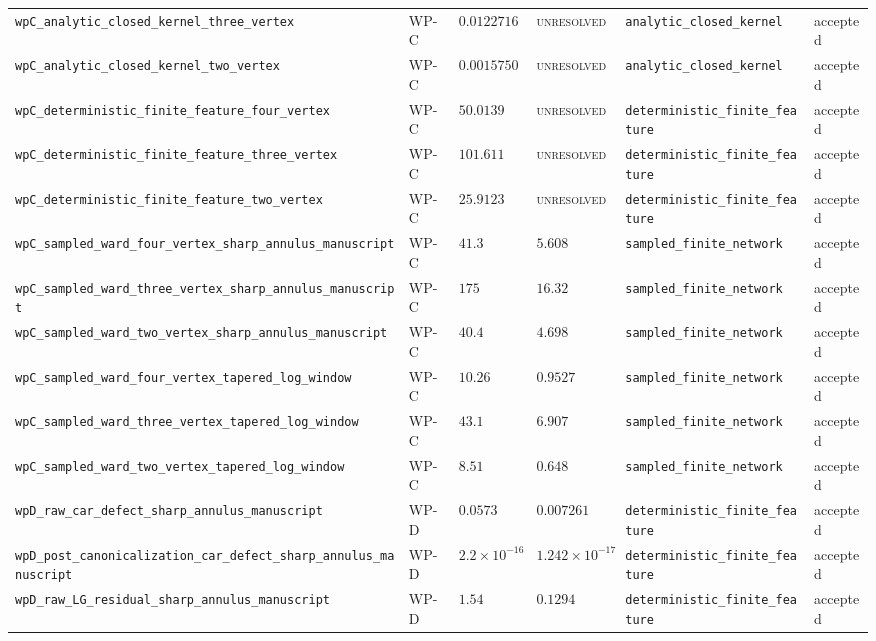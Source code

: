\begin{table}[t]
\begin{tabular}{@{}llllll@{}}
\texttt{wpC\_analytic\_closed\_kernel\_three\_vertex} & WP-C & $0.0122716$ & \textsc{unresolved} & \texttt{analytic\_closed\_kernel} & accepted \\
\texttt{wpC\_analytic\_closed\_kernel\_two\_vertex} & WP-C & $0.00157508$ & \textsc{unresolved} & \texttt{analytic\_closed\_kernel} & accepted \\
\texttt{wpC\_deterministic\_finite\_feature\_four\_vertex} & WP-C & $50.0139$ & \textsc{unresolved} & \texttt{deterministic\_finite\_feature} & accepted \\
\texttt{wpC\_deterministic\_finite\_feature\_three\_vertex} & WP-C & $101.611$ & \textsc{unresolved} & \texttt{deterministic\_finite\_feature} & accepted \\
\texttt{wpC\_deterministic\_finite\_feature\_two\_vertex} & WP-C & $25.9123$ & \textsc{unresolved} & \texttt{deterministic\_finite\_feature} & accepted \\
\texttt{wpC\_sampled\_ward\_four\_vertex\_sharp\_annulus\_manuscript} & WP-C & $41.3$ & $5.608$ & \texttt{sampled\_finite\_network} & accepted \\
\texttt{wpC\_sampled\_ward\_three\_vertex\_sharp\_annulus\_manuscript} & WP-C & $175$ & $16.32$ & \texttt{sampled\_finite\_network} & accepted \\
\texttt{wpC\_sampled\_ward\_two\_vertex\_sharp\_annulus\_manuscript} & WP-C & $40.4$ & $4.698$ & \texttt{sampled\_finite\_network} & accepted \\
\texttt{wpC\_sampled\_ward\_four\_vertex\_tapered\_log\_window} & WP-C & $10.26$ & $0.9527$ & \texttt{sampled\_finite\_network} & accepted \\
\texttt{wpC\_sampled\_ward\_three\_vertex\_tapered\_log\_window} & WP-C & $43.1$ & $6.907$ & \texttt{sampled\_finite\_network} & accepted \\
\texttt{wpC\_sampled\_ward\_two\_vertex\_tapered\_log\_window} & WP-C & $8.51$ & $0.648$ & \texttt{sampled\_finite\_network} & accepted \\
\texttt{wpD\_raw\_car\_defect\_sharp\_annulus\_manuscript} & WP-D & $0.0573$ & $0.007261$ & \texttt{deterministic\_finite\_feature} & accepted \\
\texttt{wpD\_post\_canonicalization\_car\_defect\_sharp\_annulus\_manuscript} & WP-D & $2.2\times10^{-16}$ & $1.242\times10^{-17}$ & \texttt{deterministic\_finite\_feature} & accepted \\
\texttt{wpD\_raw\_LG\_residual\_sharp\_annulus\_manuscript} & WP-D & $1.54$ & $0.1294$ & \texttt{deterministic\_finite\_feature} & accepted \\

\end{tabular}
\end{table}
